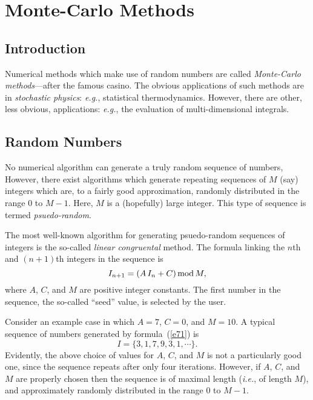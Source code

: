 \chapter{Monte-Carlo Methods}
\section{Introduction}
Numerical methods which make use of random numbers are called {\em Monte-Carlo methods}---after the famous
casino. The obvious applications of such methods are in {\em stochastic physics}: {\em e.g.}, statistical
thermodynamics. However, there are other, less obvious, applications: {\em e.g.}, the evaluation of
multi-dimensional integrals.

\section{Random Numbers}
No numerical algorithm can generate a truly random sequence of numbers, However, there exist
algorithms which generate repeating sequences of $M$ (say) integers which are, to 
a fairly good approximation, randomly distributed in the range
$0$ to $M-1$. Here, $M$ is a (hopefully) large integer. This type of
sequence is termed {\em psuedo-random}. 

The most well-known algorithm for generating psuedo-random sequences 
of integers is the so-called {\em linear congruental} method.
The formula linking the $n$th and $(n+1)$th integers in the sequence is
\begin{equation}\label{e71}
I_{n+1} = (A\,I_n+C)\,{\rm mod}\,M,
\end{equation}
where $A$, $C$, and $M$ are positive integer constants. 
The first number in the sequence, the so-called ``seed'' value, is selected by the user.

Consider an example case in which $A=7$, $C=0$, and $M=10$. A typical sequence of numbers generated by
formula~(\ref{e71}) is
\begin{equation}
I=\{3, 1, 7, 9, 3, 1, \cdots\}.
\end{equation}
Evidently, the above choice of values for $A$, $C$, and $M$ is not a particularly good one, since the
sequence repeats after only four iterations. However, if  $A$, $C$, and $M$ are properly
chosen then the sequence is of maximal length ({\em i.e.}, of length $M$), and approximately randomly
distributed in the range $0$ to $M-1$. 

